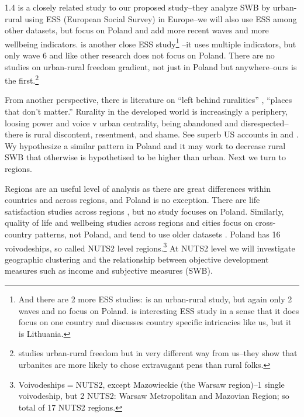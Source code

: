 \documentclass[10pt, letterpaper]{article}
\begin{document}
\begin{spacing}{1.4}
 \citet{weckroth21} is a closely related study to our proposed study--they analyze SWB by urban-rural
using ESS (European Social Survey)  in Europe--we will also use ESS among other datasets, 
 but focus on Poland and add more recent waves and more wellbeing indicators. 
\citet{knies26} is another close ESS study\footnote{And there are 2 more ESS
  studies: \citet{ivanovic2022subjective} is an urban-rural study, but again
only 2 waves and no focus on Poland. \citet{vaznoniene2019wellbeing} is
interesting ESS study in a sense that it does focus on one country and discusses
country specific intricacies like us, but it is Lithuania. %
} --it uses multiple indicators, but only  wave 6 and like other
research does not focus on Poland. %
There are no studies on urban-rural freedom gradient, not just in Poland but
anywhere--ours is the first.\footnote{\citet{yamagishi12} studies urban-rural
  freedom but in very different way from us--they show that urbanites are more
  likely to chose extravagant pens than rural folks.
}

From another perspective, there is literature on ``left behind ruralities''
 \citep{ulrich2021people}, ``places that
don't matter.'' \citep{rodriguez2018revenge}%
Rurality in the developed world is increasingly a periphery, loosing power and voice v
 urban centrality, being abandoned and disrespected--there is rural discontent,
 resentment, and shame. See superb US accounts in 
 \citet{hansonCityJournalautumn15} and \citet{fullerNYT17monD}. 
 Wy hypothesize a  similar pattern in Poland and it may work to decrease rural SWB
that otherwise is hypothetised to  be higher than urban.
Next we turn to regions.
 
 Regions are an useful level of analysis as there are
 great differences within countries and across regions, and Poland is no
exception.  There are life satisfaction studies across regions \citep[e.g.,][]{aok10_geo,ballas23,ziogas23,ziogas20}, but no study focuses on Poland.
Similarly, quality of life and wellbeing studies across regions and cities focus
on cross-country patterns, not Poland, and tend to use older datasets \citep{aok-swbLivability18,aok13liavbility}.
Poland has 16 voivodeships, so called NUTS2 level
regions.\footnote{Voivodeships$=$NUTS2, except  Mazowieckie (the Warsaw
  region)--1 single voivodeship, but 2 NUTS2: Warsaw Metropolitan and Mazovian
  Region; so total of 17 NUTS2 regions.} %
 At NUTS2 level we will investigate geographic clustering and the relationship
 between objective development measures such as income and subjective measures (SWB). 
 

\end{spacing}
\end{document}
